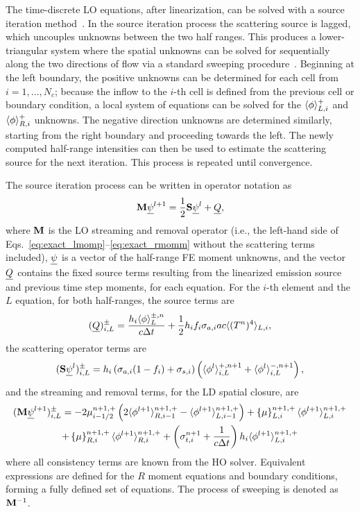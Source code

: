 The time-discrete LO equations, after linearization, can be solved with a source iteration
method~\cite{lewis,larson_morel_sn,mcclarren_notes}.  In the source iteration
process the scattering source is lagged, which
uncouples unknowns between the two half ranges.  This produces a lower-triangular
system where the spatial unknowns can be solved for sequentially along the two directions of flow via a
standard sweeping procedure~\cite{lewis,morel_ldtrt}.  Beginning at the left boundary, the
positive unknowns can be determined for each cell from $i=1,\ldots,N_c$; because the
inflow to the $i$-th cell is defined from the previous cell or boundary condition, a local system
of equations can be solved for the $\langle \phi \rangle_{L,i}^+$ and $\langle \phi \rangle_{R,i}^+$ unknowns.
The negative direction unknowns are
determined similarly, starting from the
right boundary and proceeding towards the left.  The newly computed half-range
intensities can then be used to estimate the scattering source for the next iteration.  This
process is repeated until convergence.  

The source iteration process can be written in operator notation as
\begin{equation}
    \mathbf{M} \underline{\psi}^{l+1} = \frac{1}{2}\mathbf{S}\underline{\psi}^{l} + \underline{Q},
\end{equation}
where $\mathbf{M}$ is the LO streaming and removal operator (i.e., the left-hand side of
Eqs.~\eqref{eq:exact_lmomp}--\eqref{eq:exact_rmomm} without the scattering terms
included), $\underline{\psi}$ is a vector of the half-range FE moment unknowns, and the vector
$\underline{Q}$ contains the fixed source terms resulting from the linearized emission source and previous
time step moments, for each equation.  For the $i$-th element and the $L$
equation, for both half-ranges, the source terms are
\begin{equation}
    (\underline{Q})_{i,L}^\pm = \frac{h_i\langle \phi \rangle_L^{\pm,n}}{c\Delta t} + \frac{1}{2}h_if_i \sigma_{a,i} a c \langle 
        (T^{n})^4 \rangle_{L,i},
\end{equation}
the scattering operator terms are
\begin{equation}
    (\mathbf{S} \underline{\psi}^l)^{\pm}_{i,L} = h_i\left(\sigma_{a,i} (1-f_i) + \sigma_{s,i}\right)
    \left(\langle  \phi^l \rangle_{i,L}^{+,n+1} + \langle  \phi^l \rangle_{i,L}^{-,n+1}\right),
\end{equation}
and the streaming and removal terms, for the LD spatial closure, are
\begin{multline}
    (\mathbf{M} \underline{\psi}^{l+1})^{\pm}_{i,L} = 
    -2{\mu}_{i-1/2}^{n+1,+} \left(2\langle \phi^{l+1} \rangle_{R,i-1}^{n+1,+} -
    \langle \phi^{l+1} \rangle_{L,i-1}^{n+1,+} \right) +  \left\{ \mu \right\}_{L,i}^{n+1,+}
    \langle \phi^{l+1} \rangle_{L,i}^{n+1,+} \\
  +  \left\{ \mu \right\}_{R,i}^{n+1,+}
  \langle \phi^{l+1} \rangle_{R,i}^{n+1,+} +  \left(\sigma_{t,i}^{n+1}+\frac{1}{c \Delta t} \right) h_i 
  \langle \phi^{l+1} \rangle_{L,i}^{n+1,+}
\end{multline}
where all consistency terms are known from the HO solver.
Equivalent expressions are defined for the $R$ moment equations and boundary conditions,
forming a fully defined set of equations.  The process of sweeping is denoted as $\mathbf{M}^{-1}$.

